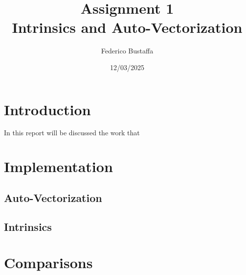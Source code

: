 \documentclass[12pt, a4paper]{article}
\title{Assignment 1\\Intrinsics and Auto-Vectorization}
\author{Federico Bustaffa}
\date{12/03/2025}
\begin{document}
\maketitle
\tableofcontents

\section{Introduction}

In this report will be discussed the work that

\section{Implementation}

\subsection{Auto-Vectorization}

\subsection{Intrinsics}

\section{Comparisons}
\end{document}
